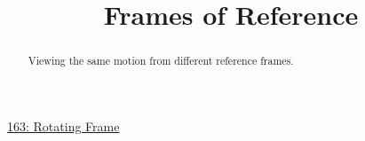 \documentclass{ximera}
\title{Frames of Reference}
\begin{document}
\begin{abstract}
Viewing the same motion from different reference frames.
\end{abstract}
\maketitle


\begin{question}  \label{Qdsf435r45te}

\begin{onlineOnly}
    \begin{center}
\end{center}
\end{onlineOnly}

\href{https://www.desmos.com/3d/sqvm9cvfyd}{163: Rotating Frame}


\end{question}
\end{document}
